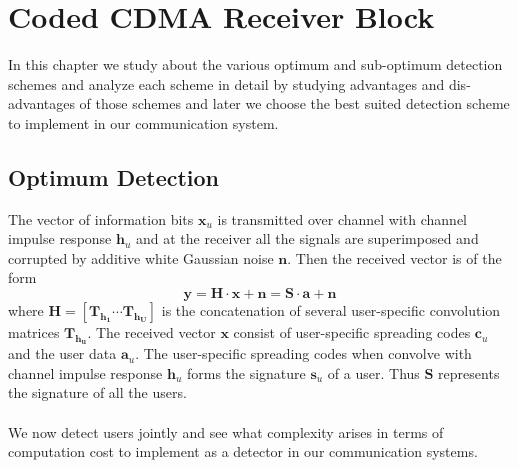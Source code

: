 \chapter{Coded CDMA Receiver Block}
In this chapter we study about the various optimum and sub-optimum detection schemes and analyze each scheme in detail by studying advantages and dis-advantages of those schemes and later we choose the best suited detection scheme to implement in our communication system.
\section{Optimum Detection}
The vector of information bits $\mathrm{\mathbf{x}}_u$ is transmitted over channel with channel impulse response $\mathrm{\mathbf{h}}_u$ and at the receiver all the signals are superimposed and corrupted by additive white Gaussian noise $\mathrm{\mathbf{n}}$. Then the received vector is of the form
\begin{equation}
\mathrm{\mathbf{y}}=\mathrm{\mathbf{H}}\cdot\mathrm{\mathbf{x}}+\mathrm{\mathbf{n}}=\mathrm{\mathbf{S}}\cdot\mathrm{\mathbf{a}}+\mathrm{\mathbf{n}}
\end{equation}
where $\mathrm{\mathbf{H}}=[\mathrm{\mathbf{T_{h_1}}}\cdots\mathrm{\mathbf{T_{h_U}}}]$ is the concatenation of several user-specific convolution matrices $\mathrm{\mathbf{T_{h_u}}}$. The received vector $\mathrm{\mathbf{x}}$ consist of user-specific spreading codes $\mathrm{\mathbf{c}}_u$ and the user data $\mathrm{\mathbf{a}}_u$. The user-specific spreading codes when convolve with channel impulse response $\mathrm{\mathbf{h}}_u$ forms the signature $\mathrm{\mathbf{s}}_u$ of a user. Thus $\mathrm{\mathbf{S}}$ represents the signature of all the users.\\ \\
We now detect users jointly and see what complexity arises in terms of computation cost to implement as a detector in our communication systems.
